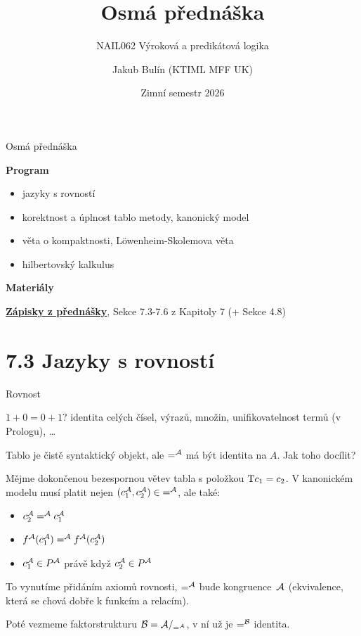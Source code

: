 \documentclass{beamer}
\title{Osmá přednáška}
\subtitle{NAIL062 Výroková a predikátová logika}
\author{Jakub Bulín (KTIML MFF UK)}
\date{Zimní semestr 2026}
\begin{document}
\maketitle


\begin{frame}{Osmá přednáška}

    \textbf{Program}
        \begin{itemize}
            \item jazyky s rovností
            \item korektnost a úplnost tablo metody, kanonický model
            \item věta o kompaktnosti, Löwenheim-Skolemova věta
            \item hilbertovský kalkulus
        \end{itemize}

    \textbf{Materiály}

        \href{https://github.com/jbulin-mff-uk/nail062/raw/main/lecture/lecture-notes/lecture-notes.pdf}{\alert{\textbf{Zápisky z přednášky}}}, Sekce 7.3-7.6 z Kapitoly 7 (+ Sekce 4.8)

\end{frame}


\section{7.3 Jazyky s rovností}


\begin{frame}{Rovnost}

    \pause
    $1+0=0+1$? identita celých čísel, výrazů, množin, unifikovatelnost termů (v Prologu), \dots

    \pause
    Tablo je čistě \alert{syntaktický} objekt, ale \alert{$=^{\mathcal{A}}$} má být \alert{identita} na $A$. Jak toho docílit?

    \pause
    Mějme dokončenou bezespornou větev tabla s položkou \alert{$\mathrm{T} c_1=c_2$}. V \alert{kanonickém modelu} musí platit nejen \alert{$(c_1^{\mathcal{A}},c_2^{\mathcal{A}})\in {=^{\mathcal{A}}}$}, ale také:

    \pause
    \begin{itemize}
        \item $c_2^{\mathcal{A}} =^{\mathcal{A}} c_1^{\mathcal{A}}$\pause
        \item $f^{\mathcal{A}}(c_1^{\mathcal{A}}) =^{\mathcal{A}} f^{\mathcal{A}}(c_2^{\mathcal{A}})$\pause
        \item $c_1^{\mathcal{A}}\in P^{\mathcal{A}}$ právě když $c_2^{\mathcal{A}}\in P^{\mathcal{A}}$
    \end{itemize}

    \pause
    To vynutíme přidáním \alert{axiomů rovnosti}, $=^{\mathcal{A}}$ bude \alert{kongruence}~$\mathcal{A}$ (ekvivalence, která se chová dobře k funkcím a relacím). 
    
    \pause
    Poté vezmeme \alert{faktorstrukturu} $\mathcal{B}=\mathcal{A}/_{=^{\mathcal{A}}}$, v ní už je $=^{\mathcal{B}}$ \alert{identita}.

\end{frame}
\end{document}
